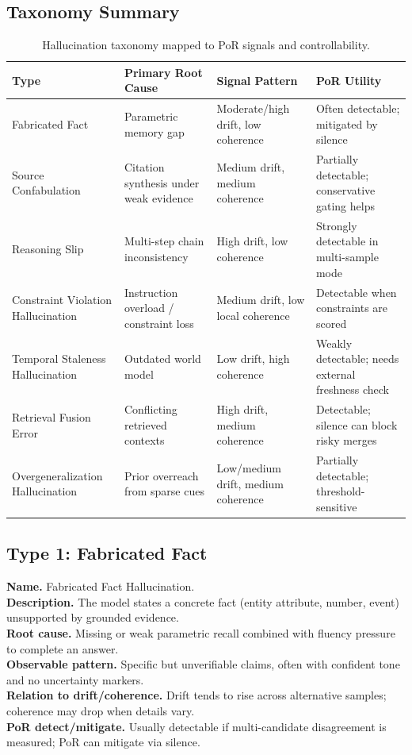 \documentclass[11pt]{article}
\begin{document}
\subsection{Taxonomy Summary}
\begin{table}[H]
\centering
\caption{Hallucination taxonomy mapped to PoR signals and controllability.}
\label{tab:hallucination-taxonomy}
\begin{tabular}{>{\raggedright\arraybackslash}p{3.1cm}>{\raggedright\arraybackslash}p{2.4cm}>{\raggedright\arraybackslash}p{2.4cm}>{\raggedright\arraybackslash}p{3.1cm}}
\toprule
\textbf{Type} & \textbf{Primary Root Cause} & \textbf{Signal Pattern} & \textbf{PoR Utility} \\
\midrule
Fabricated Fact & Parametric memory gap & Moderate/high drift, low coherence & Often detectable; mitigated by silence \\
Source Confabulation & Citation synthesis under weak evidence & Medium drift, medium coherence & Partially detectable; conservative gating helps \\
Reasoning Slip & Multi-step chain inconsistency & High drift, low coherence & Strongly detectable in multi-sample mode \\
Constraint Violation Hallucination & Instruction overload / constraint loss & Medium drift, low local coherence & Detectable when constraints are scored \\
Temporal Staleness Hallucination & Outdated world model & Low drift, high coherence & Weakly detectable; needs external freshness check \\
Retrieval Fusion Error & Conflicting retrieved contexts & High drift, medium coherence & Detectable; silence can block risky merges \\
Overgeneralization Hallucination & Prior overreach from sparse cues & Low/medium drift, medium coherence & Partially detectable; threshold-sensitive \\
\bottomrule
\end{tabular}
\end{table}

\subsection{Type 1: Fabricated Fact}
\textbf{Name.} Fabricated Fact Hallucination.\\
\textbf{Description.} The model states a concrete fact (entity attribute, number, event) unsupported by grounded evidence.\\
\textbf{Root cause.} Missing or weak parametric recall combined with fluency pressure to complete an answer.\\
\textbf{Observable pattern.} Specific but unverifiable claims, often with confident tone and no uncertainty markers.\\
\textbf{Relation to drift/coherence.} Drift tends to rise across alternative samples; coherence may drop when details vary.\\
\textbf{PoR detect/mitigate.} Usually detectable if multi-candidate disagreement is measured; PoR can mitigate via silence.
\end{document}

